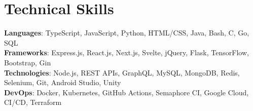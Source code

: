 \section{Technical Skills}
    \begin{itemize}[leftmargin=0.15in, label={}]
	\small{\item{
		\textbf{Languages}{: TypeScript, JavaScript, Python, HTML/CSS, Java, Bash, C, Go, SQL} \\
		\textbf{Frameworks}{: Express.js, React.js, Next.js, Svelte, jQuery, Flask, TensorFlow, Bootstrap, Gin} \\
		\textbf{Technologies}{: Node.js, REST APIs, GraphQL, MySQL, MongoDB, Redis, Selenium, Git, Android Studio, Unity} \\
		\textbf{DevOps}{: Docker, Kubernetes, GitHub Actions, Semaphore CI, Google Cloud, CI/CD, Terraform}
	}}
    \end{itemize}